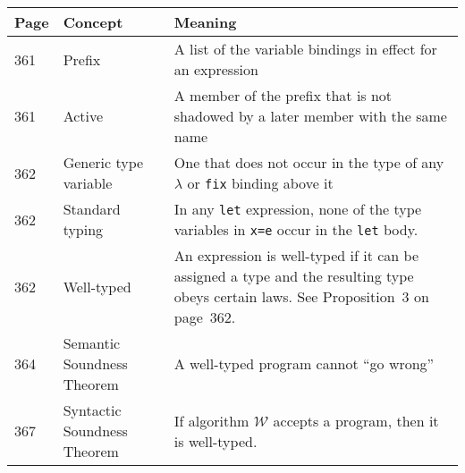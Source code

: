 \documentclass[12pt]{article}
\begin{document}
\begin{tabular}{l l p{}}
\toprule
Page & Concept & Meaning \\
\midrule
361 & Prefix & A list of the variable bindings in effect for an expression \\
361 & Active & A member of the prefix that is not shadowed by a later member with the same name \\
362 & Generic type variable & One that does not occur in the type of any $\lambda$ or \texttt{fix} binding above it \\
362 & Standard typing & In any \texttt{let} expression, none of the type variables in \texttt{x=e} occur in the \texttt{let} body. \\
362 & Well-typed & An expression is well-typed if it can be assigned a type and the resulting type obeys certain laws. See Proposition~3 on page~362.\\
364 & Semantic Soundness Theorem & A well-typed program cannot ``go wrong'' \\
367 & Syntactic Soundness Theorem & If algorithm $\mathscr{W}$ accepts a program, then it is well-typed. \\

\bottomrule
\end{tabular}
\end{document}
